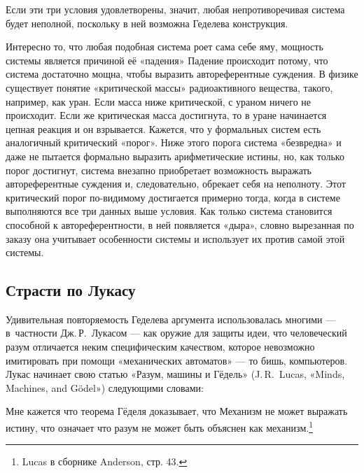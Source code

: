 \documentclass[../main.tex]{subfiles}
\begin{document}
Если эти три условия удовлетворены, значит, любая непротиворечивая система будет неполной, поскольку в ней возможна Геделева конструкция.

Интересно то, что любая подобная система роет сама себе яму, мощность системы является причиной её «падения» Падение происходит потому, что система достаточно мощна, чтобы выразить автореферентные суждения. В физике существует понятие «критической массы» радиоактивного вещества, такого, например, как уран. Если масса ниже критической, с ураном ничего не происходит. Если же критическая масса достигнута, то в уране начинается цепная реакция и он взрывается. Кажется, что у формальных систем есть аналогичный критический «порог». Ниже этого порога система «безвредна» и даже не пытается формально выразить арифметические истины, но, как только порог достигнут, система внезапно приобретает возможность выражать автореферентные суждения и, следовательно, обрекает себя на неполноту. Этот критический порог по-видимому достигается примерно тогда, когда в системе выполняются все три данных выше условия. Как только система становится способной к автореферентности, в ней появляется «дыра», словно вырезанная по заказу она учитывает особенности системы и использует их против самой этой системы.


\subsection{Страсти по Лукасу}

Удивительная повторяемость Геделева аргумента использовалась многими --- в~частности Дж.\,Р.~Лукасом --- как оружие для защиты идеи, что человеческий разум отличается неким специфическим качеством, которое невозможно имитировать при помощи «механических автоматов» --- то бишь, компьютеров. Лукас начинает свою статью «Разум, машины и Гёдель» (J.\,R.~Lucas, «Minds, Machines, and Gödel») следующими словами:

Мне кажется что теорема Гёделя доказывает, что Механизм не может выражать истину, что означает что разум не может быть объяснен как механизм.\footnote{Lucas в сборнике Anderson, стр. 43.}
\end{document}
